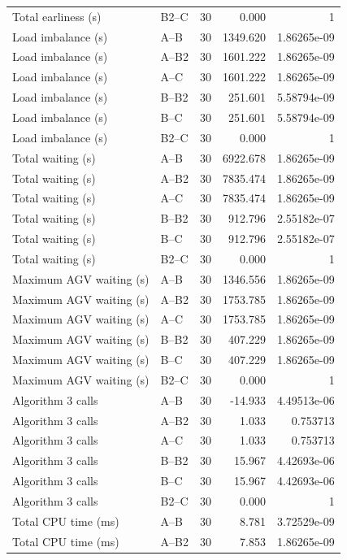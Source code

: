 \begin{table}[t]
\begin{tabular}{llrrr}
Total earliness (s) & B2--C & 30 & 0.000 & 1 \\
Load imbalance (s) & A--B & 30 & 1349.620 & 1.86265e-09 \\
Load imbalance (s) & A--B2 & 30 & 1601.222 & 1.86265e-09 \\
Load imbalance (s) & A--C & 30 & 1601.222 & 1.86265e-09 \\
Load imbalance (s) & B--B2 & 30 & 251.601 & 5.58794e-09 \\
Load imbalance (s) & B--C & 30 & 251.601 & 5.58794e-09 \\
Load imbalance (s) & B2--C & 30 & 0.000 & 1 \\
Total waiting (s) & A--B & 30 & 6922.678 & 1.86265e-09 \\
Total waiting (s) & A--B2 & 30 & 7835.474 & 1.86265e-09 \\
Total waiting (s) & A--C & 30 & 7835.474 & 1.86265e-09 \\
Total waiting (s) & B--B2 & 30 & 912.796 & 2.55182e-07 \\
Total waiting (s) & B--C & 30 & 912.796 & 2.55182e-07 \\
Total waiting (s) & B2--C & 30 & 0.000 & 1 \\
Maximum AGV waiting (s) & A--B & 30 & 1346.556 & 1.86265e-09 \\
Maximum AGV waiting (s) & A--B2 & 30 & 1753.785 & 1.86265e-09 \\
Maximum AGV waiting (s) & A--C & 30 & 1753.785 & 1.86265e-09 \\
Maximum AGV waiting (s) & B--B2 & 30 & 407.229 & 1.86265e-09 \\
Maximum AGV waiting (s) & B--C & 30 & 407.229 & 1.86265e-09 \\
Maximum AGV waiting (s) & B2--C & 30 & 0.000 & 1 \\
Algorithm 3 calls & A--B & 30 & -14.933 & 4.49513e-06 \\
Algorithm 3 calls & A--B2 & 30 & 1.033 & 0.753713 \\
Algorithm 3 calls & A--C & 30 & 1.033 & 0.753713 \\
Algorithm 3 calls & B--B2 & 30 & 15.967 & 4.42693e-06 \\
Algorithm 3 calls & B--C & 30 & 15.967 & 4.42693e-06 \\
Algorithm 3 calls & B2--C & 30 & 0.000 & 1 \\
Total CPU time (ms) & A--B & 30 & 8.781 & 3.72529e-09 \\
Total CPU time (ms) & A--B2 & 30 & 7.853 & 1.86265e-09 \\

\end{tabular}
\end{table}
